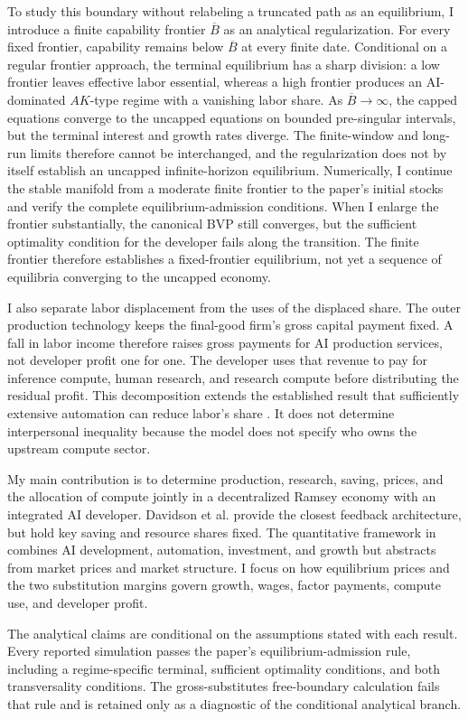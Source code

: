 To study this boundary without relabeling a truncated path as an equilibrium,
I introduce a finite capability frontier \(\overline B\) as an analytical
regularization. For every fixed frontier, capability remains below
\(\overline B\) at every finite date. Conditional on a regular frontier
approach, the terminal equilibrium has a sharp division: a low frontier leaves
effective labor essential, whereas a high frontier produces an AI-dominated
\(AK\)-type regime with a vanishing labor share. As
\(\overline B\to\infty\), the capped equations converge to the uncapped
equations on bounded pre-singular intervals, but the terminal interest and
growth rates diverge. The finite-window and long-run limits therefore cannot
be interchanged, and the regularization does not by itself establish an
uncapped infinite-horizon equilibrium. Numerically, I continue the stable
manifold from a moderate finite frontier to the paper's initial stocks and
verify the complete equilibrium-admission conditions. When I enlarge the
frontier substantially, the canonical BVP still converges, but the sufficient
optimality condition for the developer fails along the transition. The finite
frontier therefore establishes a fixed-frontier equilibrium, not yet a sequence
of equilibria converging to the uncapped economy.

I also separate labor displacement from the uses of the displaced
share. The outer production technology keeps the final-good firm's gross capital
payment fixed. A fall in labor income therefore raises gross payments for AI
production services, not developer profit one for one. The developer uses that revenue to
pay for inference compute, human research, and research compute before
distributing the residual profit. This decomposition extends the established
result that sufficiently extensive automation can reduce labor's share
\citep{acemoglurestrepo2019,trammellkorinek2023,restrepo2025agi}. It does not
determine interpersonal inequality because the model does not specify who owns
the upstream compute sector.

My main contribution is to determine production, research, saving, prices, and
the allocation of compute jointly in a decentralized Ramsey economy with an
integrated AI developer. Davidson et al. provide the closest feedback
architecture, but hold key saving and resource shares fixed. The quantitative
framework in \citet{erdiletal2025gate} combines AI development, automation,
investment, and growth but abstracts from market prices and market structure. I
focus on how equilibrium prices and the two substitution margins govern growth,
wages, factor payments, compute use, and developer profit.

The analytical claims are conditional on the assumptions stated with each
result. Every reported simulation passes the paper's equilibrium-admission
rule, including a regime-specific terminal, sufficient optimality conditions,
and both transversality conditions. The gross-substitutes free-boundary
calculation fails that rule and is retained only as a diagnostic of the
conditional analytical branch.
